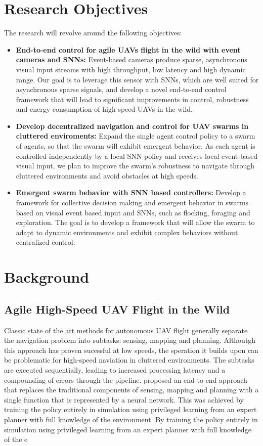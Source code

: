 \documentclass{article}
\begin{document}
\section{Research Objectives}
The research will revolve around the following objectives:    
\begin{itemize}
    \item \textbf{End-to-end control for agile UAVs flight in the wild with event cameras and SNNs:}
    Event-based cameras produce sparse, asynchronous visual input streams with high throughput, low latency and high dynamic range. Our goal is to leverage this sensor with SNNs, which are well suited for asynchronous sparse signals, and develop a novel end-to-end control framework that will lead to significant improvements in control, robustness and energy consumption of high-speed UAVs in the wild.
          
    \item \textbf{Develop decentralized navigation and control for UAV swarms in cluttered enviroments:} 
    Expand the single agent control policy to a swarm of agents, so that the swarm will exhibit emergent behavior. As each agent is controlled independently by a local SNN policy and receives local event-based visual input, we plan to improve the swarm's robustness to navigate through cluttered environments and avoid obstacles at high speeds.
            
    \item \textbf{Emergent swarm behavior with SNN based controllers:}
    Develop a framework for collective decision making and emergent behavior in swarms based on visual event based input and SNNs, such as flocking, foraging and exploration. The goal is to develop a framework that will allow the swarm to adapt to dynamic environments and exhibit complex behaviors without centralized control.
\end{itemize}

\section{Background}
\subsection{Agile High-Speed UAV Flight in the Wild}
Classic state of the art methods for autonomous UAV flight generally separate the navigation problem into subtasks: sensing, mapping and planning. Althoutgh this approach has proven sucessful at low speeds, the speration it builds upon can be problematic for high-speed naviation in cluttered environments. The subtasks are executed sequentially, leading to increased processing latency and a compounding of errors through the pipeline. \citeauthor{loquercioLearningHighSpeedFlight2021} \cite{loquercioLearningHighSpeedFlight2021} proposed an end-to-end approach that replaces the traditional components of sensing, mapping and planning with a single function that is represented by a neural network. This was achieved by training the policy entirely in simulation using privileged learning from an expert planner with full knowledge of the environment. 
By training the policy entirely in simulation using privileged learning from an expert planner with full knowledge of the e
\end{document}
